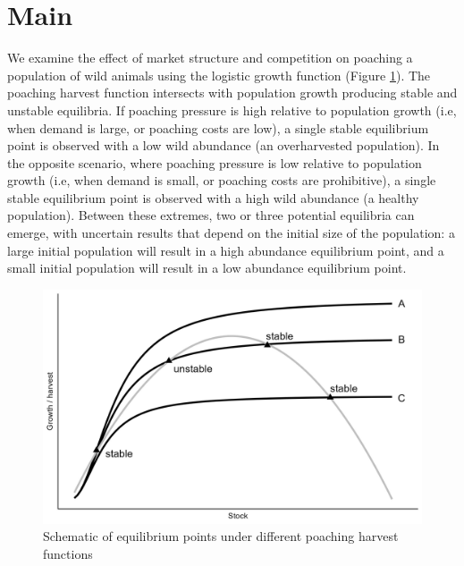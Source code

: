 \section{Main}

We examine the effect of market structure and competition on poaching a population of wild animals using the logistic growth function (Figure \ref{fig:figure2}). The poaching harvest function intersects with population growth producing stable and unstable equilibria. If poaching pressure is high relative to population growth (i.e, when demand is large, or poaching costs are low), a single stable equilibrium point is observed with a low wild abundance (an overharvested population). In the opposite scenario, where poaching pressure is low relative to population growth (i.e, when demand is small, or poaching costs are prohibitive), a single stable equilibrium point is observed with a high wild abundance (a healthy population). Between these extremes, two or three potential equilibria can emerge, with uncertain results that depend on the initial size of the population: a large initial population will result in a high abundance equilibrium point, and a small initial population will result in a low abundance equilibrium point.

\begin{figure}[h]
    \centering
    \includegraphics[width=0.85\linewidth]{figures/totoaba/Figure1_potential_equilibria.jpg}
    \caption{Schematic of equilibrium points under different poaching harvest functions}
    \label{fig:figure2}
\end{figure}

